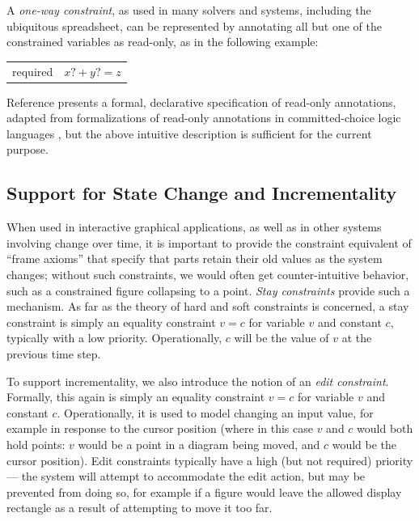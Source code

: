 A \emph{one-way constraint}, as used in many solvers and systems,
including the ubiquitous spreadsheet, can be represented by annotating
all but one of the constrained variables as read-only, as in the
following example:

\begin{center}
\begin{tabular}{rl}
required &     $x?+y?=z$ \\
\end{tabular}
\end{center}

Reference \cite{borning-lisp-symbolic-computation-1992} presents a
formal, declarative specification of read-only annotations, adapted
from formalizations of read-only annotations in committed-choice logic
languages \cite{maher-iclp-1987}, but the above intuitive description
is sufficient for the current purpose.

\subsection{Support for State Change and Incrementality}
\label{sec:state-change}

When used in interactive graphical applications, as well as in other
systems involving change over time, it is important to provide the
constraint equivalent of ``frame axioms'' that specify that parts
retain their old values as the system changes; without such
constraints, we would often get counter-intuitive behavior, such as a
constrained figure collapsing to a point.  \emph{Stay constraints}
provide such a mechanism.  As far as the theory of hard and soft
constraints is concerned, a stay constraint is simply an equality
constraint $v=c$ for variable $v$ and constant $c$, typically with a
low priority.  Operationally, $c$ will be the value of $v$ at the
previous time step.

To support incrementality, we also introduce the notion of an
\emph{edit constraint}.  Formally, this again is simply an equality
constraint $v=c$ for variable $v$ and constant $c$.  Operationally,
it is used to model changing an input value, for example in
response to the cursor position (where in this case $v$ and $c$ would
both hold points: $v$ would be a point in a diagram being moved, and
$c$ would be the cursor position).  Edit constraints typically have a
high (but not required) priority --- the system will attempt to
accommodate the edit action, but may be prevented from doing so, for
example if a figure would leave the allowed display rectangle as a
result of attempting to move it too far.

